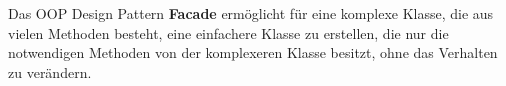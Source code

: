 Das OOP Design Pattern \textbf{Facade} ermöglicht für eine komplexe Klasse, die aus vielen Methoden besteht, 
eine einfachere Klasse zu erstellen, 
die nur die notwendigen Methoden von der komplexeren Klasse besitzt, ohne das Verhalten zu verändern.